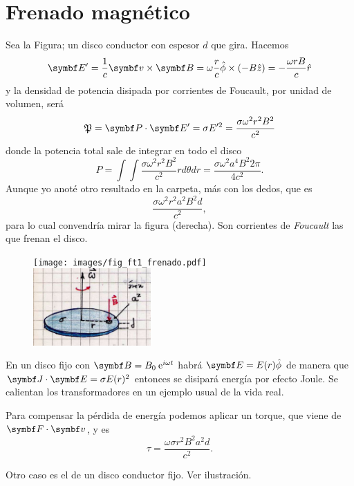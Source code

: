 \documentclass[10pt,oneside]{CBFT_book}
\begin{document}
\section{Frenado magnético}

Sea la Figura; un disco conductor con espesor $d$ que gira.
Hacemos
\[
	\vb{E}' = \frac{1}{c}\pv{v}{B} = \omega \frac{r}{c} \hat{\phi} \times (-B\hat{z}) = 
	-\frac{\omega r B}{c} \hat{r}
\]
y la densidad de potencia disipada por corrientes de Foucault, por unidad de
volumen, será
\[
	\mathfrak{P} = \pe{P}{E'} = \sigma E'^2 = \frac{\sigma \omega^2 r^2 B^2}{c^2}
\]
donde la potencia total sale de integrar en todo el disco
\[
	P = \int \int \frac{\sigma \omega^2 r^2 B^2}{c^2} r d\theta dr =
		\frac{\sigma \omega^2 a^4 B^2 2\pi }{4 c^2}.
\]
Aunque yo anoté otro resultado en la carpeta, más con los dedos, que es
\[
	\frac{\sigma \omega^2 r^2 a^2 B^2 d }{c^2},
\]
para lo cual convendría mirar la figura (derecha).
Son corrientes de {\it Foucault} las que frenan el disco.

\begin{figure}[htb]
	\begin{center}
	\texttt{[image: images/fig\_ft1\_frenado.pdf]} 
	\includegraphics[width=0.4\textwidth]{images/fig_ft1_frenadoJPG.jpg}
	\end{center}
	\caption{}
\end{figure} 

En un disco fijo con $\vb{B} = B_0 \euler^{i\omega t}$  habrá $\vb{E} = E(r) \hat{\phi}$ de manera que 
$\pe{J}{E} = \sigma E(r)^2$ entonces se disipará energía por efecto Joule. Se calientan los 
transformadores en un ejemplo usual de la vida real.

Para compensar la pérdida de energía podemos aplicar un torque, que viene de $\pe{F}{v}$,
y es
\[
	\tau = \frac{\omega \sigma r^2 B^2 a^2 d }{c^2}.
\]

Otro caso es el de un disco conductor fijo. Ver ilustración. 
\end{document}
